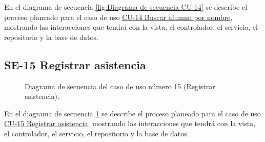 En el diagrama de secuencia \ref{fig:Diagrama de secuencia CU-14} se describe el proceso planeado para el caso de uso \hyperlink{CU-14}{CU-14 Buscar alumno por nombre}, mostrando las interacciones que tendrá con la vista, el controlador, el servicio, el repositorio y la base de datos.

\newpage

\subsection{SE-15 Registrar asistencia}

\begin{figure}[htbp!]
	\begin{center}
		\caption{Diagrama de secuencia del caso de uso número 15 (Registrar asistencia).}
		\label{fig:Diagrama de secuencia CU-15}
	\end{center}
\end{figure}

En el diagrama de secuencia \ref{fig:Diagrama de secuencia CU-15} se describe el proceso planeado para el caso de uso \hyperlink{CU-15}{CU-15 Registrar asistencia}, mostrando las interacciones que tendrá con la vista, el controlador, el servicio, el repositorio y la base de datos.

